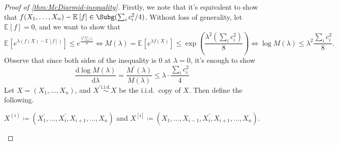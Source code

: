 \begin{proof}[Proof of \autoref{thm:McDiarmid-inequality}]
	Firstly, we note that it's equivalent to show that \(f(X_1, \dots , X_n) - \mathbb{E}_{}\left[f \right] \in \Subg(\sum_{i} c_i^2 / 4) \). Without loss of generality, let \(\mathbb{E}_{}\left[f \right] = 0\), and we want to show that
	\[
		\mathbb{E}_{}\left[e^{\lambda (f(X) - \mathbb{E}_{}\left[f \right] )} \right] \leq e^{\frac{\lambda ^2 \sum_{i} c_i}{8}}
		\iff  M(\lambda ) = \mathbb{E}_{}\left[e^{\lambda f(X)} \right] \leq \exp \left( \frac{\lambda ^2 \left( \sum_{i} c_i^2 \right) }{8} \right)
		\iff  \log M(\lambda ) \leq \lambda ^2 \frac{\sum_{i} c_i^2}{8}.
	\]
	Observe that since both sides of the inequality is \(0\) at \(\lambda = 0\), it's enough to show
	\[
		\frac{\mathrm{d}\log M(\lambda )}{\mathrm{d}\lambda } = \frac{M^{\prime} (\lambda )}{M(\lambda )} \leq \lambda \cdot \frac{\sum_{i} c_i^2}{4}
	\]
	Let \(X = (X_1, \dots , X_n)\), and \(X^{\prime} \overset{\text{i.i.d.} }{\sim } X\) be the i.i.d.\ copy of \(X\). Then define the following.

	\begin{notation}\label{not:lec5}
		\(X^{(i)} \coloneqq (X_1^{\prime} , \dots , X_i^{\prime} , X_{i+1}, \dots , X_n)\) and \(X^{[i]} \coloneqq (X_1, \dots , X_{i-1}, X_i^{\prime} , X_{i+1}, \dots , X_n)\).
	\end{notation}


\end{proof}
